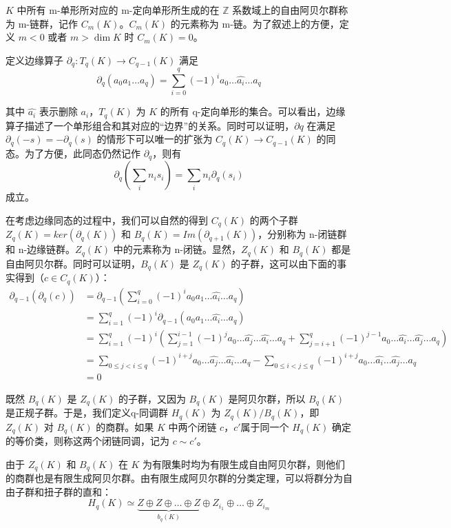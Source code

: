 $ K $ 中所有 m-单形所对应的 m-定向单形所生成的在 $ \mathbb{Z} $ 系数域上的自由阿贝尔群称为 m-链群，记作 $ C_m(K) $。$ C_m(K) $ 的元素称为 m-链。为了叙述上的方便，定义 $ m < 0 $ 或者 $ m > \dim K $ 时 $ C_m(K) = 0 $。

定义边缘算子 $ \partial_q: T_q(K) \to C_{q-1}(K) $ 满足 
$$ \partial_q (a_0 a_1 \dots a_q) = \sum_{i=0}^{q} (-1)^i a_0 \dots \hat{a_i} \dots a_q $$

其中  $ \hat{a_i} $ 表示删除 $ a_i $，$ T_q(K) $ 为 $ K $ 的所有 q-定向单形的集合。可以看出，边缘算子描述了一个单形组合和其对应的“边界”的关系。同时可以证明，$ \partial q $ 在满足 $\partial_q(-s) = -\partial_q(s) $ 的情形下可以唯一的扩张为 $ C_q(K) \to C_{q-1}(K) $ 的同态。为了方便，此同态仍然记作 $ \partial_q $，则有
$$
\partial_q (\sum_i n_i s_i) = \sum_i n_i \partial_q (s_i)
$$
成立。

在考虑边缘同态的过程中，我们可以自然的得到 $ C_q(K) $ 的两个子群 $ Z_q(K) = ker(\partial_q(K)) $ 和 $ B_q(K) = Im(\partial_{q+1}(K)) $，分别称为 n-闭链群和 n-边缘链群。$ Z_q(K) $ 中的元素称为 n-闭链。显然，$ Z_q(K) $ 和 $ B_q(K) $ 都是自由阿贝尔群。同时可以证明，$ B_q(K) $ 是 $ Z_q(K) $ 的子群，这可以由下面的事实得到（$ c \in C_q(K) $）：
\begin{align*}
\partial_{q-1} (\partial_q (c)) &= \partial_{q-1} (\sum_{i=0}^q (-1)^i a_0 a_1 \dots \hat{a_i} \dots a_q) \\
&= \sum_{i=1}^q (-1)^i \partial_{q-1} (a_0 a_1 \dots \hat{a_i} \dots a_q) \\
&= \sum_{i=1}^q (-1)^i ( \sum_{j=1}^{i-1} (-1)^j a_0 \dots \hat{a_j} \dots \hat{a_i} \dots a_q + \sum_{j=i+1}^{q} (-1)^{j-1} a_0 \dots \hat{a_i} \dots \hat{a_j} \dots a_q ) \\
&= \sum_{0 \le j < i \le q} (-1)^{i+j} a_0 \dots \hat{a_j} \dots \hat{a_i} \dots a_q - \sum_{0 \le i < j \le q} (-1)^{i+j} a_0 \dots \hat{a_i} \dots \hat{a_j} \dots a_q \\
&= 0
\end{align*}

既然 $ B_q(K) $ 是 $ Z_q(K) $ 的子群，又因为 $ B_q(K) $ 是阿贝尔群，所以 $ B_q(K) $ 是正规子群。于是，我们定义q-同调群 $ H_q(K) $ 为 $ Z_q(K) / B_q(K) $，即 $ Z_q(K) $ 对 $ B_q(K) $ 的商群。如果 $ K $ 中两个闭链 $ c $，$ c' $属于同一个 $ H_q(K) $ 确定的等价类，则称这两个闭链同调，记为 $ c \sim c' $。

由于 $ Z_q(K) $ 和 $ B_q(K) $ 在 $ K $ 为有限集时均为有限生成自由阿贝尔群，则他们的商群也是有限生成阿贝尔群。由有限生成阿贝尔群的分类定理，可以将群分为自由子群和扭子群的直和：
$$
H_q(K) \simeq \underbrace{Z \oplus Z \oplus \dots \oplus Z}_{b_q(K)} \oplus Z_{i_1} \oplus \dots \oplus Z_{i_m}
$$

